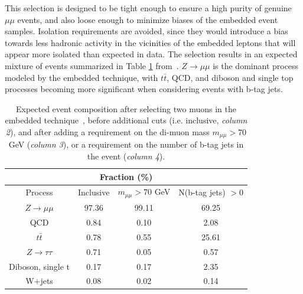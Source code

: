 This selection is designed to be tight enough to ensure a high purity of genuine $\mu\mu$ events, and also loose enough to minimize biases of the embedded event samples. Isolation requirements are avoided, since they would introduce a bias towards less hadronic activity in the vicinities of the embedded leptons that will appear more isolated than expected in data. The selection results in an expected mixture of events summarized in Table \ref{table:embedded_mixture_composition} from~\cite{CMS-TAU-18-001}. $Z \rightarrow \mu\mu$ is the dominant process modeled by the embedded technique, with $t\bar{t}$, QCD, and diboson and single top processes becoming more significant when considering events with b-tag jets.


\begin{table}[ht]
    \centering
    \begin{tabular}{|cccc|}
    \hline
    \multicolumn{4}{|c|}{Fraction (\%)}                                                                                                             \\ \hline
    \multicolumn{1}{|c|}{Process}                  & \multicolumn{1}{c|}{Inclusive} & \multicolumn{1}{c|}{$m_{\mu\mu} > 70$ GeV} & N(b-tag jets) $> 0$ \\ \hline
    \multicolumn{1}{|c|}{$Z \rightarrow \mu\mu$}   & \multicolumn{1}{c|}{97.36}     & \multicolumn{1}{c|}{99.11}                 & 69.25            \\
    \multicolumn{1}{|c|}{QCD}                      & \multicolumn{1}{c|}{0.84}      & \multicolumn{1}{c|}{0.10}                  & 2.08             \\
    \multicolumn{1}{|c|}{$t\bar{t}$}               & \multicolumn{1}{c|}{0.78}      & \multicolumn{1}{c|}{0.55}                  & 25.61            \\
    \multicolumn{1}{|c|}{$Z \rightarrow \tau\tau$} & \multicolumn{1}{c|}{0.71}      & \multicolumn{1}{c|}{0.05}                  & 0.57             \\
    \multicolumn{1}{|c|}{Diboson, single t}        & \multicolumn{1}{c|}{0.17}      & \multicolumn{1}{c|}{0.17}                  & 2.35             \\
    \multicolumn{1}{|c|}{W+jets}                   & \multicolumn{1}{c|}{0.08}      & \multicolumn{1}{c|}{0.02}                  & 0.14             \\ \hline
    \end{tabular}
    \caption[Expected event composition after selecting two muons in the embedded technique, before additional cuts (i.e. inclusive), and after adding a requirement on the di-muon mass $m_{\mu\mu} > 70$ GeV, or a requirement on the number of b-tag jets in the event.]{Expected event composition after selecting two muons in the embedded technique~\cite{CMS-TAU-18-001}, before additional cuts (i.e. inclusive, \textit{column 2}), and after adding a requirement on the di-muon mass $m_{\mu\mu} > 70$ GeV (\textit{column 3}), or a requirement on the number of b-tag jets in the event (\textit{column 4}).}
    \label{table:embedded_mixture_composition}
\end{table}
